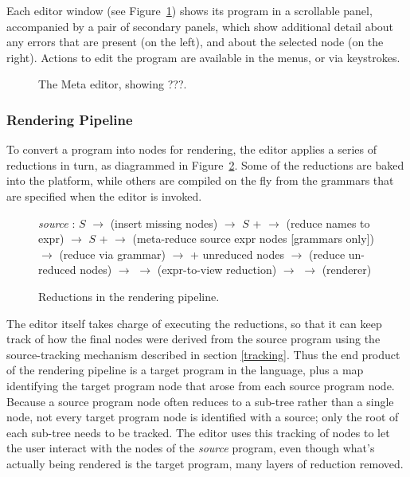 Each editor window (see Figure\ \ref{fig-editor}) shows its program in a scrollable panel, accompanied by a pair of secondary panels, which show additional detail about any errors that are present (on the left), and about the selected node (on the right). Actions to edit the program are available in the menus, or via keystrokes. 

\begin{figure}[ht]
\caption{\label{fig-editor} The Meta editor, showing ???.}
\end{figure}


\subsubsection{Rendering Pipeline}
To convert a program into  nodes for rendering, the editor applies a series of reductions in turn, as diagrammed in Figure\ \ref{fig-pipeline}. Some of the reductions are baked into the platform, while others are compiled on the fly from the grammars that are specified when the editor is invoked. 

\begin{figure}[ht]

\emph{source} : $S$ $\to$ (insert missing nodes) $\to$ $S$ +  $\to$ (reduce names to expr) $\to$ $S$ +  $\to$ (meta-reduce source expr nodes [grammars only]) $\to$ (reduce via grammar) $\to$  + unreduced nodes $\to$ (reduce un-reduced nodes) $\to$  $\to$ (expr-to-view reduction) $\to$  $\to$ (renderer)

\caption{\label{fig-pipeline} Reductions in the rendering pipeline.}
\end{figure}

The editor itself takes charge of executing the reductions, so that it can keep track of how the final  nodes were derived from the source program using the source-tracking mechanism described in section \ref{tracking}. Thus the end product of the rendering pipeline is a target program in the  language, plus a map identifying the target program node that arose from each source program node. Because a source program node often reduces to a sub-tree rather than a single node, not every target program node is identified with a source; only the root of each sub-tree needs to be tracked. The editor uses this tracking of nodes to let the user interact with the nodes of the \emph{source} program, even though what's actually being rendered is the target program, many layers of reduction removed.


